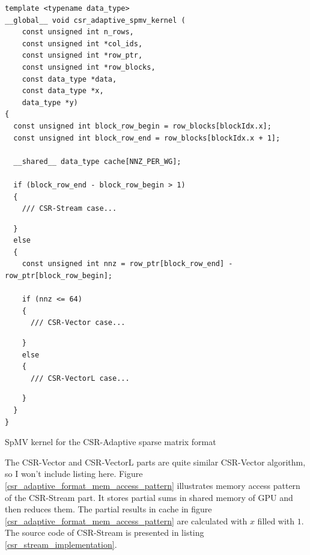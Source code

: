 \documentclass{article}
\begin{document}
\begin{listing}[H]
\begin{verbatim}
template <typename data_type>
__global__ void csr_adaptive_spmv_kernel (
    const unsigned int n_rows,
    const unsigned int *col_ids,
    const unsigned int *row_ptr,
    const unsigned int *row_blocks,
    const data_type *data,
    const data_type *x,
    data_type *y)
{
  const unsigned int block_row_begin = row_blocks[blockIdx.x];
  const unsigned int block_row_end = row_blocks[blockIdx.x + 1];

  __shared__ data_type cache[NNZ_PER_WG];

  if (block_row_end - block_row_begin > 1)
  {
    /// CSR-Stream case...
\end{verbatim}
\begin{verbatim}
  }
  else
  {
    const unsigned int nnz = row_ptr[block_row_end] - row_ptr[block_row_begin];

    if (nnz <= 64)
    {
      /// CSR-Vector case...
\end{verbatim}
\begin{verbatim}
    }
    else
    {
      /// CSR-VectorL case...
\end{verbatim}
\begin{verbatim}
    }
  }
}
\end{verbatim}
\caption{SpMV kernel for the CSR-Adaptive sparse matrix format}
\label{csr_adaptive}
\end{listing}


The CSR-Vector and CSR-VectorL parts are quite similar CSR-Vector algorithm, so I won't include listing here. Figure \ref{csr_adaptive_format_mem_access_pattern}
illustrates memory access pattern of the CSR-Stream part. It stores partial sums in shared memory of GPU and then reduces them. The partial results in cache in
figure \ref{csr_adaptive_format_mem_access_pattern} are calculated with $x$ filled with $1$. The source code of CSR-Stream is presented in listing \ref{csr_stream_implementation}.
\end{document}
